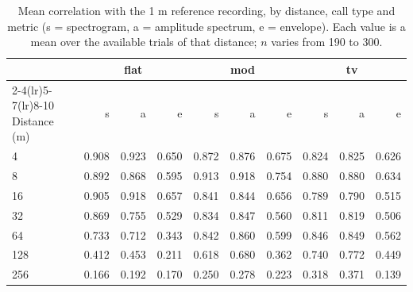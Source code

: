 \begin{table}[htbp]
  \centering
  \caption{Mean correlation with the 1 m reference recording, by distance, call type and metric
  (s = spectrogram, a = amplitude spectrum, e = envelope). Each value is a mean over the available
  trials of that distance; $n$ varies from 190 to 300.}\label{tab:q2-raw}
  \scriptsize
  \setlength{\tabcolsep}{3.4pt}
  \begin{tabular}{lrrrrrrrrr}
    \toprule
    & \multicolumn{3}{c}{flat} & \multicolumn{3}{c}{mod} & \multicolumn{3}{c}{tv} \\
    \cmidrule(lr){2-4}\cmidrule(lr){5-7}\cmidrule(lr){8-10}
    Distance (m) & s & a & e & s & a & e & s & a & e \\
    \midrule
    4 & 0.908 & 0.923 & 0.650 & 0.872 & 0.876 & 0.675 & 0.824 & 0.825 & 0.626 \\
    8 & 0.892 & 0.868 & 0.595 & 0.913 & 0.918 & 0.754 & 0.880 & 0.880 & 0.634 \\
    16 & 0.905 & 0.918 & 0.657 & 0.841 & 0.844 & 0.656 & 0.789 & 0.790 & 0.515 \\
    32 & 0.869 & 0.755 & 0.529 & 0.834 & 0.847 & 0.560 & 0.811 & 0.819 & 0.506 \\
    64 & 0.733 & 0.712 & 0.343 & 0.842 & 0.860 & 0.599 & 0.846 & 0.849 & 0.562 \\
    128 & 0.412 & 0.453 & 0.211 & 0.618 & 0.680 & 0.362 & 0.740 & 0.772 & 0.449 \\
    256 & 0.166 & 0.192 & 0.170 & 0.250 & 0.278 & 0.223 & 0.318 & 0.371 & 0.139 \\
    \bottomrule
  \end{tabular}
\end{table}
